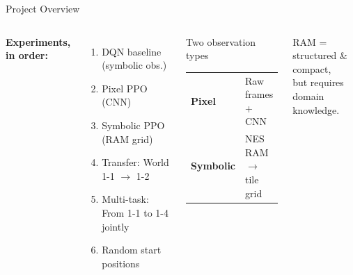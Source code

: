 \documentclass[aspectratio=169, 12pt]{beamer}
\begin{document}
\begin{frame}{Project Overview}
\begin{columns}[T]
\textbf{Experiments, in order:}
\begin{enumerate}
  \item DQN baseline (symbolic obs.)
  \item Pixel PPO (CNN)
  \item Symbolic PPO (RAM grid)
  \item Transfer: World 1-1 $\to$ 1-2
  \item Multi-task: From 1-1 to 1-4 jointly
  \item Random start positions
\end{enumerate}

\begin{block}{Two observation types}
\small
\begin{tabular}{ll}
  \toprule
  \textbf{Pixel} & Raw frames + CNN \\
  \textbf{Symbolic} & NES RAM $\to$ tile grid \\
  \bottomrule
\end{tabular}
\end{block}
\vspace{6pt}
\begin{exampleblock}{}
\small
RAM = structured \& compact,\\
but requires domain knowledge.
\end{exampleblock}
\end{columns}
\end{frame}




\end{document}

